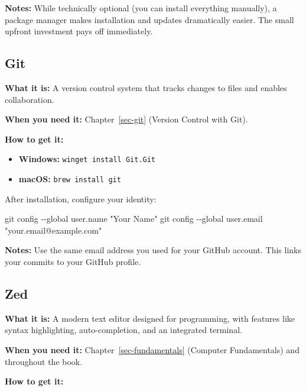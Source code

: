\documentclass[
  letterpaper,
  DIV=11,
  numbers=noendperiod]{scrreprt}
\newenvironment{Shaded}{\begin{snugshade}}{\end{snugshade}}
\newcommand{\AttributeTok}[1]{\textcolor[rgb]{0.40,0.45,0.13}{#1}}
\newcommand{\FunctionTok}[1]{\textcolor[rgb]{0.28,0.35,0.67}{#1}}
\newcommand{\NormalTok}[1]{\textcolor[rgb]{0.00,0.23,0.31}{#1}}
\newcommand{\StringTok}[1]{\textcolor[rgb]{0.13,0.47,0.30}{#1}}
\providecommand{\tightlist}{%
  \setlength{\itemsep}{0pt}\setlength{\parskip}{0pt}}
\begin{document}
\textbf{Notes:} While technically optional (you can install everything
manually), a package manager makes installation and updates dramatically
easier. The small upfront investment pays off immediately.

\subsection*{Git}\label{git}

\textbf{What it is:} A version control system that tracks changes to
files and enables collaboration.

\textbf{When you need it:} Chapter~\ref{sec-git} (Version Control with
Git).

\textbf{How to get it:}

\begin{itemize}
\tightlist
\item
  \textbf{Windows:} \texttt{winget\ install\ Git.Git}
\item
  \textbf{macOS:} \texttt{brew\ install\ git}
\end{itemize}

After installation, configure your identity:

\begin{Shaded}
\begin{Highlighting}[]
\FunctionTok{git}\NormalTok{ config }\AttributeTok{{-}{-}global}\NormalTok{ user.name }\StringTok{"Your Name"}
\FunctionTok{git}\NormalTok{ config }\AttributeTok{{-}{-}global}\NormalTok{ user.email }\StringTok{"your.email@example.com"}
\end{Highlighting}
\end{Shaded}

\textbf{Notes:} Use the same email address you used for your GitHub
account. This links your commits to your GitHub profile.

\subsection*{Zed}\label{zed}

\textbf{What it is:} A modern text editor designed for programming, with
features like syntax highlighting, auto-completion, and an integrated
terminal.

\textbf{When you need it:} Chapter~\ref{sec-fundamentals} (Computer
Fundamentals) and throughout the book.

\textbf{How to get it:}
\end{document}
